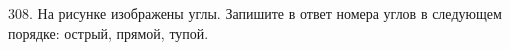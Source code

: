 308. На рисунке изображены углы. Запишите в ответ номера углов в следующем порядке: острый, прямой, тупой.\\
\begin{figure}[ht!]
\end{figure}\newpage\noindent
